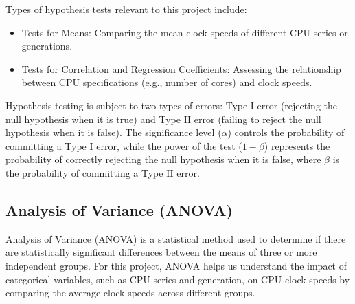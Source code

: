 Types of hypothesis tests relevant to this project include:
\begin{itemize}
    \item Tests for Means: Comparing the mean clock speeds of different CPU series or generations.
    \item Tests for Correlation and Regression Coefficients: Assessing the relationship between CPU specifications (e.g., number of cores) and clock speeds.
\end{itemize}

Hypothesis testing is subject to two types of errors: Type I error (rejecting the null hypothesis when it is true) and Type II error (failing to reject the null hypothesis when it is false). The significance level ($\alpha$) controls the probability of committing a Type I error, while the power of the test ($1-\beta$) represents the probability of correctly rejecting the null hypothesis when it is false, where $\beta$ is the probability of committing a Type II error.

\subsection{Analysis of Variance (ANOVA)}
Analysis of Variance (ANOVA) is a statistical method used to determine if there are statistically significant differences between the means of three or more independent groups. For this project, ANOVA helps us understand the impact of categorical variables, such as CPU series and generation, on CPU clock speeds by comparing the average clock speeds across different groups.\\


